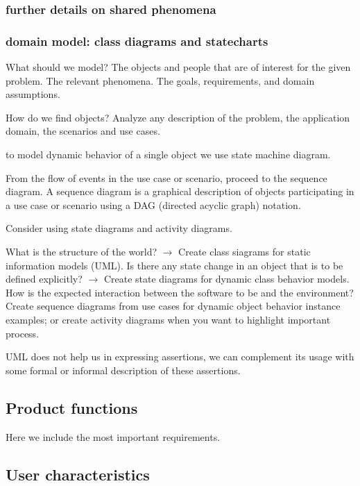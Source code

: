 \subsubsection{further details on shared phenomena}
\label{subsubsect:furtherdetailsonsharedphenomena}

\subsubsection{domain model: class diagrams and statecharts}
\label{subsubsect:domainmodel}

What should we model? The objects and people that are of interest for the given problem. The relevant phenomena. The goals, requirements, and domain assumptions.

How do we find objects? Analyze any description of the problem, the application domain, the scenarios and use cases. 

to model dynamic behavior of a single object we use state machine diagram.

From the flow of events in the use case or scenario, proceed to the sequence diagram. A sequence diagram is a graphical description of objects participating in a use case or scenario using a DAG (directed acyclic graph) notation.

Consider using state diagrams and activity diagrams.

What is the structure of the world? $\rightarrow$ Create class siagrams for static information models (UML). Is there any state change in an object that is to be defined explicitly? $\rightarrow$ Create state diagrams for dynamic class behavior models. How is the expected interaction between the software to be and the environment? Create sequence diagrams from use cases for dynamic object behavior instance examples; or create activity diagrams when you want to highlight important process.

UML does not help us in expressing assertions, we can complement its usage with some formal or informal description of these assertions.

\subsection{Product functions}
\label{subsect:productfunctions}

Here we include the most important requirements.

\subsection{User characteristics}
\label{subsect:usercharacteristics}

